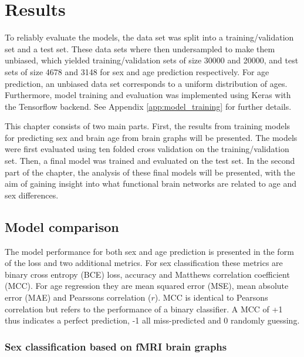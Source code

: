 \chapter{Results}


To reliably evaluate the models, the data set was split into a training/validation set and a test set. These data sets where then undersampled to make them unbiased, which yielded training/validation sets of size 30000 and 20000, and test sets of size  4678 and 3148 for sex and age prediction respectively. For age prediction, an unbiased data set corresponds to a uniform distribution of ages. Furthermore, model training and evaluation was implemented using Keras with the Tensorflow backend. See Appendix \ref{app:model_training} for further details. 

This chapter consists of two main parts. First, the results from training models for predicting sex and brain age from brain graphs will be presented. The models were first evaluated using ten folded cross validation on the training/validation set. Then, a final model was trained and evaluated on the test set. In the second part of the chapter, the analysis of these final models will be presented, with the aim of gaining insight into what functional brain networks are related to age and sex differences. 


\section{Model comparison}
The model performance for both sex and age prediction is presented in the form of the loss and two additional metrics. For sex classification these metrics are binary cross entropy (BCE) loss, accuracy and Matthews correlation coefficient (MCC). For age regression they are mean squared error (MSE), mean absolute error (MAE) and Pearssons correlation ($r$). MCC is identical to Pearsons correlation but refers to the performance of a binary classifier. A MCC of +1 thus indicates a perfect prediction, -1 all miss-predicted and 0 randomly guessing.

\subsection{Sex classification based on fMRI brain graphs}

